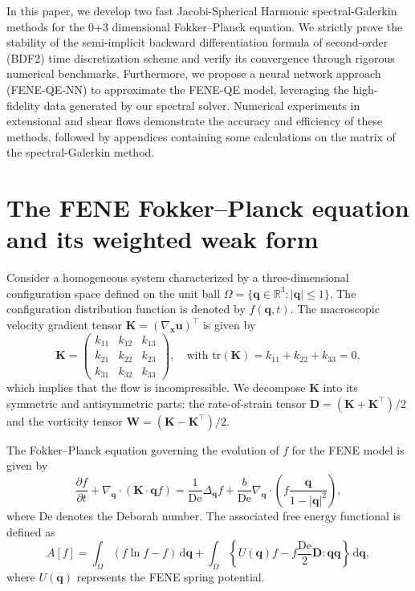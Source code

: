 \documentclass[preprint,12pt]{elsarticle}
\begin{document}
In this paper, we develop two fast Jacobi-Spherical Harmonic spectral-Galerkin methods for the 0+3 dimensional Fokker--Planck equation. We strictly prove the stability of the semi-implicit backward differentiation formula of second-order (BDF2) time discretization scheme and verify its convergence through rigorous numerical benchmarks. Furthermore, we propose a neural network approach (FENE-QE-NN) to approximate the FENE-QE model, leveraging the high-fidelity data generated by our spectral solver. Numerical experiments in extensional and shear flows demonstrate the accuracy and efficiency of these methods, followed by appendices containing some calculations on the matrix of the spectral-Galerkin method.

\section{The FENE Fokker--Planck equation and its weighted weak form}

Consider a homogeneous system characterized by a three-dimensional configuration space defined on the unit ball $\Omega=\{\bm{q} \in \mathbb{R}^3: |\bm{q}| \le 1\}$. The configuration distribution function is denoted by $f(\bm{q},t)$. The macroscopic velocity gradient tensor $\bm{K}=(\nabla_{\bm{x}}\boldsymbol{u})^\top$ is given by
\begin{equation*}
\bm{K}=
\begin{pmatrix}
k_{11} & k_{12} & k_{13} \\
k_{21} & k_{22} & k_{23} \\
k_{31} & k_{32} & k_{33}
\end{pmatrix},
\quad \text{with } \mathrm{tr}(\bm{K}) = k_{11}+k_{22}+k_{33}=0,
\end{equation*}
which implies that the flow is incompressible. We decompose $\bm{K}$ into its symmetric and antisymmetric parts: the rate-of-strain tensor $\bm{D}=(\bm{K}+\bm{K}^\top)/2$ and the vorticity tensor $\bm{W}=(\bm{K}-\bm{K}^\top)/2$.

The Fokker--Planck equation governing the evolution of $f$ for the FENE model is given by
\begin{equation}
    \frac{\partial f}{\partial t}+\nabla_{\bm{q}}\cdot(\bm{K}\cdot \bm{q}f)=\frac{1}{\mathrm{De}}\Delta_{\bm{q}}f+\frac{b}{\mathrm{De}}\nabla_{\bm{q}}\cdot\left(f\frac{\bm{q}}{1-|\bm{q}|^2}\right),\label{eq:FP equation}
\end{equation}
where $\mathrm{De}$ denotes the Deborah number. The associated free energy functional is defined as
\begin{equation}
    A[f]=\int_{\Omega}(f\ln f-f)\,\mathrm{d}\bm{q}+\int_{\Omega}\left\{U(\bm{q})f - f\frac{\mathrm{De}}{2}\bm{D}:\bm{q}\bm{q}\right\}\,\mathrm{d}\bm{q},
\end{equation}
where $U(\bm{q})$ represents the FENE spring potential.
\end{document}
